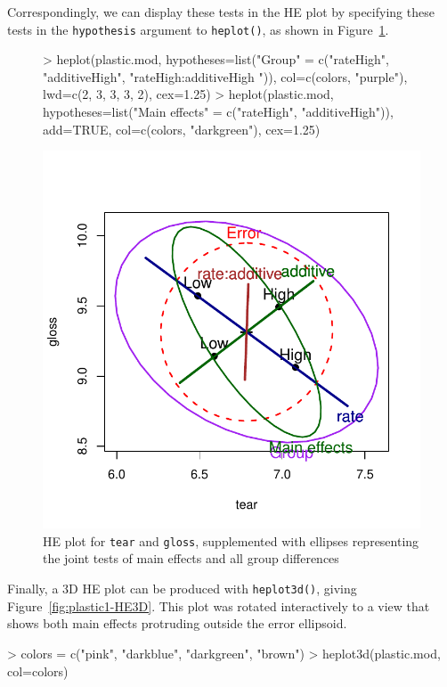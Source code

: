 \documentclass[11pt]{article}
\newcommand{\figref}[1]{Figure~\ref{#1}}
\newcommand{\code}[1]{{\texttt{#1}}}
\newcommand{\func}[1]{{\texttt{#1()}}}
\begin{document}
Correspondingly, we can display these tests in the HE plot by specifying these tests in the
\code{hypothesis} argument to \func{heplot}, as shown in \figref{fig:plastic2}.
\begin{figure}[htb]
\begin{center}
\begin{Schunk}
\begin{Sinput}
> heplot(plastic.mod, hypotheses=list("Group" = 
         c("rateHigh", "additiveHigh", "rateHigh:additiveHigh ")),
         col=c(colors, "purple"),
         lwd=c(2, 3, 3, 3, 2), cex=1.25)
> heplot(plastic.mod, hypotheses=list("Main effects" = 
         c("rateHigh", "additiveHigh")), add=TRUE,
         col=c(colors, "darkgreen"), cex=1.25)
\end{Sinput}
\end{Schunk}
\includegraphics{fig/plot-plastic2}
\caption{HE plot for \code{tear} and \code{gloss}, supplemented with ellipses representing
	the joint tests of main effects and all group differences}
\label{fig:plastic2}
\end{center}
\end{figure}

Finally, a 3D HE plot can be produced with \func{heplot3d}, giving \figref{fig:plastic1-HE3D}.
This plot was rotated interactively to a view that shows both main effects
protruding outside the error ellipsoid.
\begin{Schunk}
\begin{Sinput}
> colors = c("pink", "darkblue", "darkgreen", "brown")
> heplot3d(plastic.mod, col=colors)
\end{Sinput}
\end{Schunk}
\end{document}
